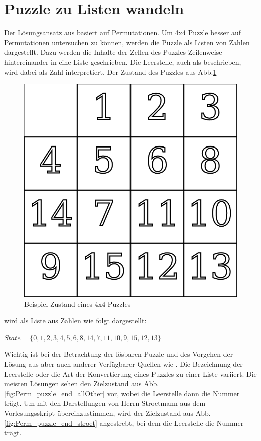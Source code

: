 \section{Puzzle zu Listen wandeln} %
\label{sec:PuzzleToList}
Der Lösungsansatz aus \autocite{Unsolvable-14-15-Numberphile-YT:online} basiert auf Permutationen. Um 4x4 Puzzle besser auf Permutationen untersuchen zu können, werden die Puzzle als Listen von Zahlen dargestellt. Dazu werden die Inhalte der Zellen des Puzzles Zeilenweise hintereinander in eine Liste geschrieben. Die Leerstelle, auch als  beschrieben, wird dabei als Zahl  interpretiert.
Der Zustand des Puzzles aus Abb.\ref{fig:Perm_puzzle_start_Pic}
\begin{figure}[H]
	\centering
	\includegraphics[width=.5\textwidth,keepaspectratio]{img/Start_Puzzle2.png}
	\captionsetup{format=hang}
	\caption{Beispiel Zustand eines 4x4-Puzzles \label{fig:Perm_puzzle_start_Pic}}
\end{figure}
\begin{minipage}{\linewidth}
	wird als Liste aus Zahlen wie folgt dargestellt:
	\begin{center}
		$State = \{0,1,2,3,4,5,6,8,14,7,11,10,9,15,12,13\}$
	\end{center}
\end{minipage}\WNL%
Wichtig ist bei der Betrachtung der lösbaren Puzzle und des Vorgehen der Lösung aus \autocite{Unsolvable-14-15-Numberphile-YT:online} aber auch anderer Verfügbarer Quellen wie \autocite{solving-15-puzzle-lvi:article,geeksforgeeks:online,archer-15-puzzle:article}. Die Bezeichnung der Leerstelle oder die Art der Konvertierung eines Puzzles zu einer Liste variiert. Die meisten Lösungen sehen den Zielzustand aus Abb.\ref{fig:Perm_puzzle_end_allOther} vor, wobei die Leerstelle dann die Nummer  trägt. Um mit den Darstellungen von Herrn Stroetmann aus dem Vorlesungsskript \autocite{github-stroetmann:online} übereinzustimmen, wird der Zielzustand aus Abb.\ref{fig:Perm_puzzle_end_stroet} angestrebt, bei dem die Leerstelle die Nummer  trägt.\\
